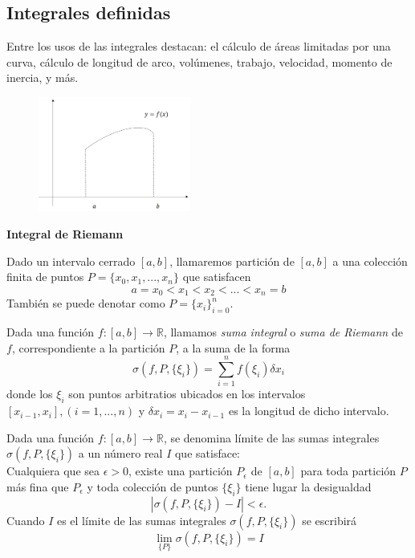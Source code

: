 \documentclass[10pt,twoside]{SelfArx} %
\begin{document}
 \subsection{Integrales definidas}
 Entre los usos de las integrales destacan: el cálculo de áreas limitadas por una curva, cálculo de longitud de arco, volúmenes, trabajo, velocidad, momento de inercia, y más. 
 \begin{figure}[h]
 	\centering
 	\includegraphics[width=5cm]{integracion1}
 	\caption{}
 	\label{integracion1}
 	
 \end{figure}
 \textbf{Integral de Riemann}\\
\begin{thm}
	Dado un intervalo cerrado $ [a,b] $, llamaremos partición de $ [a,b] $ a una colección finita de puntos $ P=\{x_{0}, x_{1},..., x_{n}\} $ que satisfacen 
	\[ a=x_{0}<x_{1}<x_{2}<...<x_{n}=b \]
	También se puede denotar como $ P=\{x_{i}\}_{i=0}^{n} $.
\end{thm}
\begin{thm}
	Dada una función $ f:[a,b]\rightarrow\mathbb{R} $, llamamos \textsl{suma integral} o \textsl{suma de Riemann} de $ f $, correspondiente a la partición $ P $, a la suma de la forma
	\[ \sigma(f,P,\{\xi_{i}\})=\sum_{i=1}^{n}f(\xi_{i})\delta x_{i} \]
	donde los $ \xi_{i} $ son puntos arbitratios ubicados en los intervalos $ [x_{i-1}, x_{i}], (i=1,...,n) $ y $ \delta x_{i}=x_{i}-x_{i-1} $ es la longitud de dicho intervalo.
\end{thm}
\begin{thm}
	Dada una función $ f:[a,b]\rightarrow\mathbb{R} $, se denomina límite de las sumas integrales $ \sigma(f,P,\{\xi_{i}\}) $ a un número real $ I $ que satisface:\\
	Cualquiera que sea $ \epsilon>0 $, existe una partición $ P_{\epsilon} $ de $ [a,b] $ para toda partición $ P $ más fina que $ P_{\epsilon} $ y toda colección de puntos $ \{\xi_{i}\} $ tiene lugar la desigualdad  
	\[ 	|\sigma(f,P,\{\xi_{i}\})-I|<\epsilon. \]
	Cuando $ I $ es el límite de las sumas integrales $ \sigma(f,P,\{\xi_{i}\}) $ se escribirá
	\[ \lim\limits_{\{P\}}\sigma(f,P,\{\xi_{i}\})=I \]
\end{thm}
\end{document}
